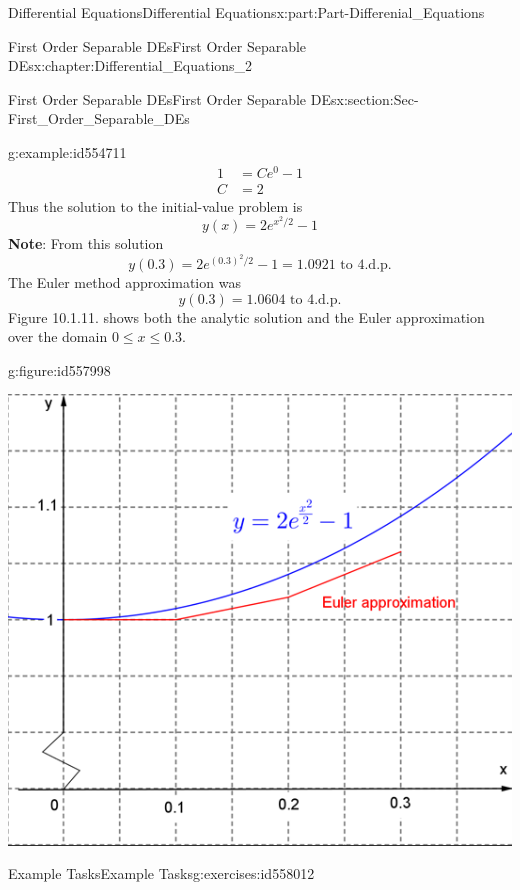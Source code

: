\documentclass[oneside,10pt,]{book}
\newcommand{\terminology}[1]{\textbf{#1}}
\numberwithin{equation}{section}
\newcommand{\amp}{&}
\begin{document}
\begin{partptx}{Differential Equations}{}{Differential Equations}{}{}{x:part:Part-Differenial_Equations}
\begin{chapterptx}{First Order Separable DEs}{}{First Order Separable DEs}{}{}{x:chapter:Differential_Equations_2}
\begin{sectionptx}{First Order Separable DEs}{}{First Order Separable DEs}{}{}{x:section:Sec-First_Order_Separable_DEs}
\begin{example}{}{g:example:id554711}
\begin{align*}
1 \amp=Ce^0-1\\
C \amp =2
\end{align*}
%
 Thus the solution to the initial-value problem is%
\begin{equation*}
y(x)=2e^{x^2/2}-1
\end{equation*}
\terminology{Note}: From this solution%
\begin{equation*}
y(0.3)=2e^{(0.3)^2/2}-1=1.0921 \textrm{ to 4.d.p.}
\end{equation*}
The Euler method approximation was%
\begin{equation*}
y(0.3)=1.0604 \textrm{ to 4.d.p.}
\end{equation*}
Figure 10.1.11. shows both the analytic solution and the Euler approximation over the domain \(0\leq x\leq 0.3\). \begin{figureptx}{}{g:figure:id557998}{}%
\begin{image}{0.125}{0.75}{0.125}%
\includegraphics[width=\linewidth]{./DifferentialEquations/Images/2/1_example6.png}
\end{image}%
\tcblower
\end{figureptx}%
%
\end{example}
%
%
\typeout{************************************************}
\typeout{************************************************}
%
\begin{exercises-subsection-numberless}{Example Tasks}{}{Example Tasks}{}{}{g:exercises:id558012}

\end{exercises-subsection-numberless}
\end{sectionptx}
\end{chapterptx}
\end{partptx}
\end{document}
